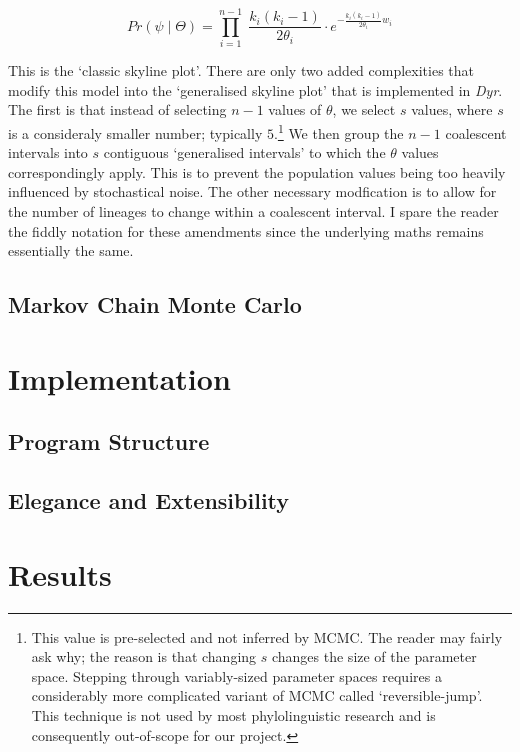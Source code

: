 \documentclass[10pt,journal,compsoc]{IEEEtran}
\begin{document}
\begin{equation}\label{eqn:skyline}
Pr(\psi\;|\;\Theta) = \prod_{i = 1}^{n - 1}\; \frac{k_i(k_i-1)}{2\theta_i} \cdot e^{-\frac{k_i(k_i-1)}{2\theta_i} w_i}
\end{equation}

This is the `classic skyline plot'. There are only two added complexities that modify this model into the `generalised skyline plot' that is implemented in \textit{Dyr}. The first is that instead of selecting $n - 1$ values of $\theta$, we select $s$ values, where $s$ is a consideraly smaller number; typically $5$.\footnote{This value is pre-selected and not inferred by MCMC. The reader may fairly ask why; the reason is that changing $s$ changes the size of the parameter space. Stepping through variably-sized parameter spaces requires a considerably more complicated variant of MCMC called `reversible-jump'. This technique is not used by most phylolinguistic research and is consequently out-of-scope for our project.} We then group the $n - 1$ coalescent intervals into $s$ contiguous `generalised intervals' to which the $\theta$ values correspondingly apply. This is to prevent the population values being too heavily influenced by stochastical noise. The other necessary modfication is to allow for the number of lineages to change within a coalescent interval. I spare the reader the fiddly notation for these amendments since the underlying maths remains essentially the same.


\subsection{Markov Chain Monte Carlo}

\section{Implementation}

\subsection{Program Structure}

\subsection{Elegance and Extensibility}

\section{Results}
\end{document}
